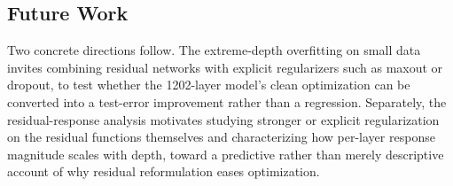 \subsection*{Future Work}
Two concrete directions follow. The extreme-depth overfitting on small data invites combining
residual networks with explicit regularizers such as maxout or dropout, to test whether the
1202-layer model's clean optimization can be converted into a test-error improvement rather
than a regression. Separately, the residual-response analysis motivates studying stronger or
explicit regularization on the residual functions themselves and characterizing how per-layer
response magnitude scales with depth, toward a predictive rather than merely descriptive
account of why residual reformulation eases optimization.
